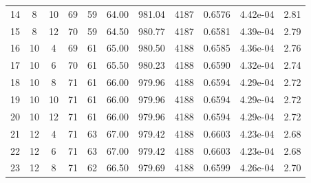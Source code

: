 {\begin{longtable}{|c|c|c|c|c|c|c|c|c|c|c|}
            14           & 8              & 10             & 69                  & 59                   & 64.00                & 981.04            & 4187               & 0.6576               & 4.42e-04         & 2.81            \\
            15           & 8              & 12             & 70                  & 59                   & 64.50                & 980.77            & 4187               & 0.6581               & 4.39e-04         & 2.79            \\ \hline
            16           & 10             & 4              & 69                  & 61                   & 65.00                & 980.50            & 4188               & 0.6585               & 4.36e-04         & 2.76            \\
            17           & 10             & 6              & 70                  & 61                   & 65.50                & 980.23            & 4188               & 0.6590               & 4.32e-04         & 2.74            \\
            18           & 10             & 8              & 71                  & 61                   & 66.00                & 979.96            & 4188               & 0.6594               & 4.29e-04         & 2.72            \\
            19           & 10             & 10             & 71                  & 61                   & 66.00                & 979.96            & 4188               & 0.6594               & 4.29e-04         & 2.72            \\
            20           & 10             & 12             & 71                  & 61                   & 66.00                & 979.96            & 4188               & 0.6594               & 4.29e-04         & 2.72            \\ \hline
            21           & 12             & 4              & 71                  & 63                   & 67.00                & 979.42            & 4188               & 0.6603               & 4.23e-04         & 2.68            \\
            22           & 12             & 6              & 71                  & 63                   & 67.00                & 979.42            & 4188               & 0.6603               & 4.23e-04         & 2.68            \\
            23           & 12             & 8              & 71                  & 62                   & 66.50                & 979.69            & 4188               & 0.6599               & 4.26e-04         & 2.70            \\

\end{longtable}}
